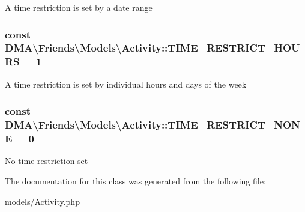 A time restriction is set by a date range \hypertarget{classDMA_1_1Friends_1_1Models_1_1Activity_ac78040e8784e02c2d1bcce5221ac6cb8}{
\subsubsection[{T\-I\-M\-E\-\_\-\-R\-E\-S\-T\-R\-I\-C\-T\-\_\-\-H\-O\-U\-R\-S}]{\setlength{\rightskip}{0pt plus 5cm}const D\-M\-A\textbackslash{}\-Friends\textbackslash{}\-Models\textbackslash{}\-Activity\-::\-T\-I\-M\-E\-\_\-\-R\-E\-S\-T\-R\-I\-C\-T\-\_\-\-H\-O\-U\-R\-S = 1}}\label{classDMA_1_1Friends_1_1Models_1_1Activity_ac78040e8784e02c2d1bcce5221ac6cb8}
A time restriction is set by individual hours and days of the week \hypertarget{classDMA_1_1Friends_1_1Models_1_1Activity_ab9dd8b18c4810beabdcf8e45039913c8}{
\subsubsection[{T\-I\-M\-E\-\_\-\-R\-E\-S\-T\-R\-I\-C\-T\-\_\-\-N\-O\-N\-E}]{\setlength{\rightskip}{0pt plus 5cm}const D\-M\-A\textbackslash{}\-Friends\textbackslash{}\-Models\textbackslash{}\-Activity\-::\-T\-I\-M\-E\-\_\-\-R\-E\-S\-T\-R\-I\-C\-T\-\_\-\-N\-O\-N\-E = 0}}\label{classDMA_1_1Friends_1_1Models_1_1Activity_ab9dd8b18c4810beabdcf8e45039913c8}
No time restriction set 

The documentation for this class was generated from the following file\-:\begin{DoxyCompactItemize}
\item 
models/Activity.\-php\end{DoxyCompactItemize}
